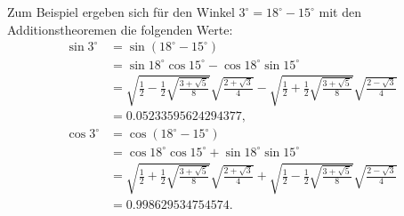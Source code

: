 Zum Beispiel ergeben sich für den Winkel $3^\circ = 18^\circ - 15^\circ$
mit den Additionstheoremen die folgenden Werte:
\begin{align*}
\sin3^\circ
&=
\sin(18^\circ-15^\circ)
\\
&=\sin18^\circ \cos 15^\circ - \cos18^\circ\sin15^\circ
\\
&=
\sqrt{\frac12-\frac12
\sqrt{\frac{3+\sqrt{5}}{8}}
}
\sqrt{\frac{2+\sqrt{3}}{4}}
-
\sqrt{\frac12+\frac12
\sqrt{\frac{3+\sqrt{5}}{8}}
}
\sqrt{\frac{2-\sqrt{3}}{4}}
\\
&=
0.05233595624294377,
\\
\cos3^\circ
&=
\cos(18^\circ-15^\circ)
\\
&=
\cos18^\circ\cos15^\circ + \sin18^\circ\sin15^\circ
\\
&=
\sqrt{\frac12+\frac12
\sqrt{\frac{3+\sqrt{5}}{8}}
}
\sqrt{\frac{2+\sqrt{3}}{4}}
+
\sqrt{\frac12-\frac12
\sqrt{\frac{3+\sqrt{5}}{8}}
}
\sqrt{\frac{2-\sqrt{3}}{4}}
\\
&=
0.998629534754574.
\end{align*}


